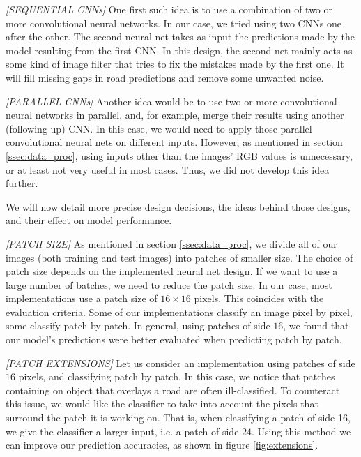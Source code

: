 \documentclass[10pt,conference,compsocconf]{IEEEtran}
\begin{document}
\textit{[SEQUENTIAL CNNs]}  
 One first such idea is to use a combination of two or more convolutional neural networks. In our case, we tried using two CNNs one after the other. The second neural net takes as input the predictions made by the model resulting from the first CNN. In this design, the second net mainly acts as some kind of image filter that tries to fix the mistakes made by the first one. It will fill missing gaps in road predictions and remove some unwanted noise.

\textit{[PARALLEL CNNs]}  
Another idea would be to use two or more convolutional neural networks in parallel, and, for example, merge their results using another (following-up) CNN. In this case, we would need to apply those parallel convolutional neural nets on different inputs. However, as mentioned in section \ref{ssec:data_proc}, using inputs other than the images' RGB values is unnecessary, or at least not very useful in most cases. Thus, we did not develop this idea further.

We will now detail more precise design decisions, the ideas behind those designs, and their effect on model performance.

\textit{[PATCH SIZE]} 
As mentioned in section \ref{ssec:data_proc}, we divide all of our images (both training and test images) into patches of smaller size. The choice of patch size depends on the implemented neural net design. If we want to use a large number of batches, we need to reduce the patch size. In our case, most implementations use a patch size of $16 \times 16$ pixels. This coincides with the evaluation criteria. Some of our implementations classify an image pixel by pixel, some classify patch by patch. In general, using patches of side $16$, we found that our model's predictions were better evaluated when predicting patch by patch.

\textit{[PATCH EXTENSIONS]} 
Let us consider an implementation using patches of side $16$ pixels, and classifying patch by patch. In this case, we notice that patches containing on object that overlays a road are often ill-classified. To counteract this issue, we would like the classifier to take into account the pixels that surround the patch it is working on. That is, when classifying a patch of side 16, we give the classifier a larger input, i.e. a patch of side $24$. Using this method we can improve our prediction accuracies, as shown in figure \ref{fig:extensions}.
\end{document}
